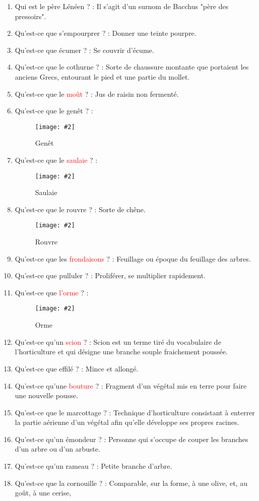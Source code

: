 \documentclass[a4paper, 11pt, hidelinks]{article}
\newcommand{\img}[4]{\begin{figure}[!ht]
    \centering
    \texttt{[image: \#2]}
    \caption{#3}
    \label{#4}
    \end{figure} }
\begin{document}
\begin{enumerate}
      \item Qui est le père Lénéen ? : Il s'agit d'un surnom de Bacchus "père des pressoirs".
      \item Qu'est-ce que s'empourprer ? : Donner une teinte pourpre.
      \item Qu'est-ce que écumer ? : Se couvrir d'écume.
      \item Qu'est-ce que le cothurne ? : Sorte de chaussure montante que portaient les
            anciens Grecs, entourant le pied et une partie du mollet.
      \item Qu'est-ce que le \textcolor{red}{moût} ? : Jus de raisin non fermenté.
      \item Qu'est-ce que le genêt ? :
            \img{0.5}{genet.jpg}{Genêt}{52}
            \newpage
      \item Qu'est-ce que le \textcolor{red}{saulaie} ? :
            \img{0.5}{saulaie.jpg}{Saulaie}{53}
      \item Qu'est-ce que le rouvre ? : Sorte de chêne.
            \img{0.5}{rouvre.jpg}{Rouvre}{54}
      \item Qu'est-ce que les \textcolor{red}{frondaisons} ? : Feuillage ou époque du feuillage des arbres.
      \item Qu'est-ce que pulluler ? : Proliférer, se multiplier rapidement.
      \item Qu'est-ce que \textcolor{red}{l'orme} ? :
            \img{0.5}{orme.jpg}{Orme}{55}
      \item Qu'est-ce qu'un \textcolor{red}{scion} ? : Scion est un terme tiré du vocabulaire de l’horticulture et
            qui désigne une branche souple fraichement poussée.
      \item Qu'est-ce que effilé ? : Mince et allongé.
      \item Qu'est-ce qu'une \textcolor{red}{bouture} ?  : Fragment d'un végétal mis en terre pour faire une nouvelle pousse.
      \item Qu'est-ce que le marcottage ? : Technique d'horticulture consistant à enterrer la partie aérienne
            d'un végétal afin qu'elle développe ses propres racines.
      \item Qu'est-ce qu'un émondeur ? : Personne qui s'occupe de couper les branches d'un arbre ou d'un arbuste.
      \item Qu'est-ce qu'un rameau ? : Petite branche d'arbre.
      \item Qu'est-ce que la cornouille ? : Comparable, sur la forme, à une olive, et, au goût, à une cerise,

\end{enumerate}
\end{document}
